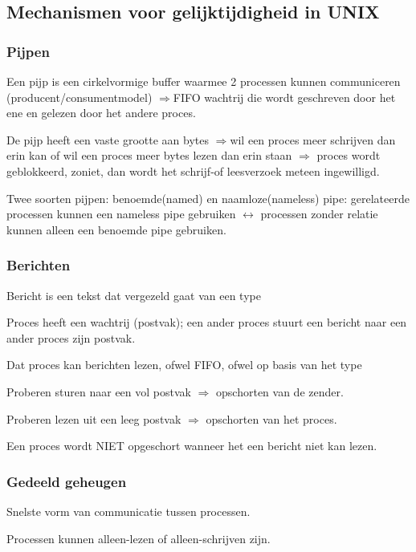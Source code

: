 \subsection{Mechanismen voor gelijktijdigheid in UNIX}

\subsubsection{Pijpen}

Een pijp is een cirkelvormige buffer waarmee 2 processen kunnen communiceren (producent/consumentmodel) $\Rightarrow$FIFO wachtrij die wordt geschreven door het ene en gelezen door het andere proces.

De pijp heeft een vaste grootte aan bytes $\Rightarrow$wil een proces meer schrijven dan erin kan of wil een proces meer bytes lezen dan erin staan $\Rightarrow$ proces wordt geblokkeerd, zoniet, dan wordt het schrijf-of leesverzoek meteen ingewilligd.

Twee soorten pijpen: benoemde(named) en naamloze(nameless) pipe: gerelateerde processen kunnen een nameless pipe gebruiken $\leftrightarrow$ processen zonder relatie kunnen alleen een benoemde pipe gebruiken.


\subsubsection{Berichten}

Bericht is een tekst dat vergezeld gaat van een type

Proces heeft een wachtrij (postvak); een ander proces stuurt een bericht naar een ander proces zijn postvak.

Dat proces kan berichten lezen, ofwel FIFO, ofwel op basis van het type

Proberen sturen naar een vol postvak $\Rightarrow$ opschorten van de zender. 

Proberen lezen uit een leeg postvak $\Rightarrow$ opschorten van het proces.

Een proces wordt NIET opgeschort wanneer het een bericht niet kan lezen.


\subsubsection{Gedeeld geheugen}

Snelste vorm van communicatie tussen processen.

Processen kunnen alleen-lezen of alleen-schrijven zijn.

